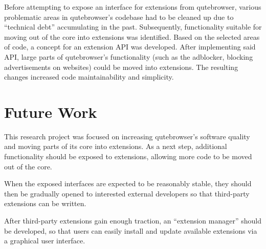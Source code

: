 Before attempting to expose an interface for extensions from qutebrowser,
various problematic areas in qutebrowser's codebase had to be cleaned up due to
``technical debt'' accumulating in the past. Subsequently, functionality
suitable for moving out of the core into extensions was identified. Based on
the selected areas of code, a concept for an extension API was developed. After
implementing said API, large parts of qutebrowser's functionality (such as the
adblocker, blocking advertisements on websites) could be moved into extensions.
The resulting changes increased code maintainability and simplicity.

\section*{Future Work}
This research project was focused on increasing qutebrowser's software quality
and moving parts of its core into extensions. As a next step, additional
functionality should be exposed to extensions, allowing more code to be moved
out of the core.

When the exposed interfaces are expected to be reasonably stable,
they should then be gradually opened to interested external developers so that
third-party extensions can be written.

After third-party extensions gain enough traction, an ``extension manager''
should be developed, so that users can easily install and update available
extensions via a graphical user interface.